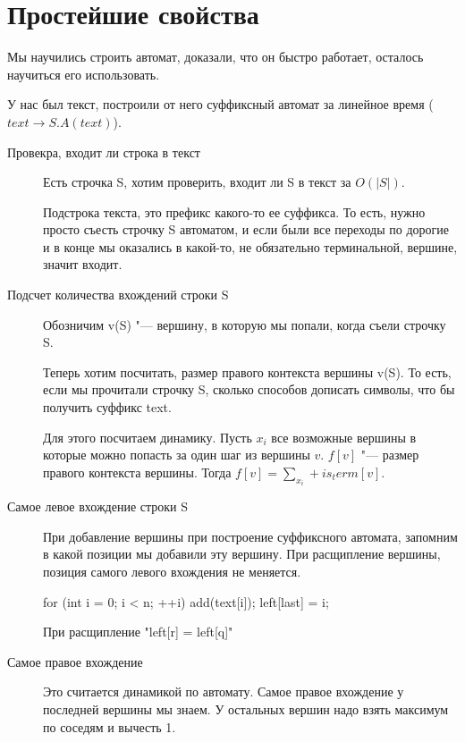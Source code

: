 ﻿\date{September 22, 2016}

\section{Простейшие свойства}
Мы научились строить автомат, доказали, что он быстро работает, осталось 
научиться его использовать.%

У нас был текст, построили от него суффиксный автомат за линейное время ($text \to S.A(text)$). 

\begin{description}
\item[Провекра, входит ли строка в текст]
    Есть строчка S, хотим проверить, входит ли S в текст за $O(|S|)$.

    Подстрока текста, это префикс какого-то ее суффикса. То есть, нужно просто 
    съесть строчку S автоматом, и если были все переходы по дорогие и в конце мы 
    оказались в какой-то, не обязательно терминальной, вершине, значит входит.

\item[Подсчет количества вхождений строки S]
    
    Обозничим v(S) "--- вершину, в которую мы попали, когда съели строчку S.

    Теперь хотим посчитать, размер правого контекста вершины v(S). То есть, 
    если мы прочитали строчку S, сколько способов дописать символы, что бы 
    получить суффикс text. 

    Для этого посчитаем динамику. Пусть $x_i$ все возможные вершины в которые 
    можно попасть за один шаг из вершины $v$. $f[v]$ "--- размер правого контекста вершины. 
    Тогда $f[v] = \sum_{x_i} + is_term[v]$.
\item[Самое левое вхождение строки S]
    При добавление вершины при построение суффиксного автомата,
    запомним в какой позиции мы добавили эту вершину. При расщипление
    вершины, позиция самого левого вхождения не меняется.

    \begin{cppcode}
    for (int i = 0; i < n; ++i) {
        add(text[i]);
        left[last] = i;
    }
    \end{cppcode}

    При расщипление \cpp"left[r] = left[q]"
\item[Самое правое вхождение]
    Это считается динамикой по автомату. Самое правое вхождение у
    последней вершины мы знаем. У остальных вершин надо взять максимум по соседям и вычесть 1. 
\end{description}

